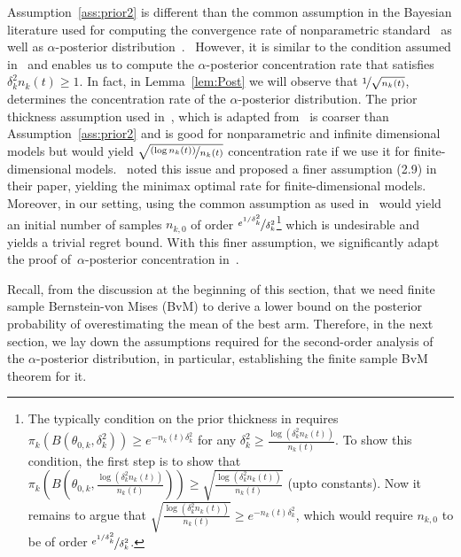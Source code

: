 \documentclass[11pt]{article}
\begin{document}
Assumption~\ref{ass:prior2} is different than the common assumption in the Bayesian literature used for computing the convergence rate of nonparametric standard~\citep{GGV,ZG} as well as $\alpha$-posterior distribution~\citep{bhattacharya2019bayesian}. ~However, it is similar to the condition assumed in~\citet[(2.9)]{GGV} %
and enables us to compute the $\alpha$-posterior concentration rate that satisfies $\delta_k^2 n_{k}(t) \geq 1$. In fact, in Lemma~\ref{lem:Post} we will observe that $\nicefrac{1}{\sqrt{n_{k}(t)}}$, determines the concentration rate of the $\alpha$-posterior distribution.  The prior thickness assumption used in~\citet{bhattacharya2019bayesian}, which is adapted from~\citet[2.3]{GGV} is coarser than Assumption~\ref{ass:prior2} and is good for nonparametric and infinite dimensional models but would yield  $\sqrt{\nicefrac{(\log n_{k}(t))}{n_{k}(t)}}$ concentration rate if we use it for finite-dimensional models.~\citet{GGV} noted this issue and proposed a finer assumption (2.9) in their paper, yielding the minimax optimal rate for finite-dimensional models. Moreover, in our setting, using the common assumption as used in~\cite{bhattacharya2019bayesian}  would yield an initial number of samples $n_{k,0}$ of order $\nicefrac{e^{1/\delta_k^2}}{\delta_k^2}$\footnote{The typically condition on the prior thickness in \citet{bhattacharya2019bayesian} requires $\pi_k(B\left(\theta_{0,k}, \delta_k^2 \right) ) \geq  e^{- n_{k}(t) \delta_k^2 }$ for any $\delta_k^2 \geq \frac{\log(\delta_k^2 n_{k}(t))}{n_{k}(t)}$. To show this condition, the first step is to show that $\pi_k(B\left(\theta_{0,k}, \frac{\log(\delta_k^2 n_{k}(t))}{n_{k}(t)} \right) )\geq \sqrt{\frac{\log(\delta_k^2 n_{k}(t))}{n_{k}(t)}}$ (upto constants). Now it remains to argue that $ \sqrt{\frac{\log(\delta_k^2 n_{k}(t))}{n_{k}(t)}} \geq e^{-n_{k}(t)\delta_k^2}$, which would require $n_{k,0}$ to be of order  $\nicefrac{e^{1/\delta_k^2}}{\delta_k^2}$.} which is undesirable and yields a trivial regret bound. With this finer assumption, we significantly adapt the proof of~$\alpha$-posterior concentration in~\cite{bhattacharya2019bayesian}.  

Recall, from the discussion at the beginning of this section, that we need finite sample Bernstein-von Mises (BvM) to derive a lower bound on the posterior probability of overestimating the mean of the best arm. Therefore, in the next section, we lay down the assumptions required for the second-order analysis of the $\alpha$-posterior distribution, in particular, establishing the finite sample BvM theorem for it. 
\end{document}
